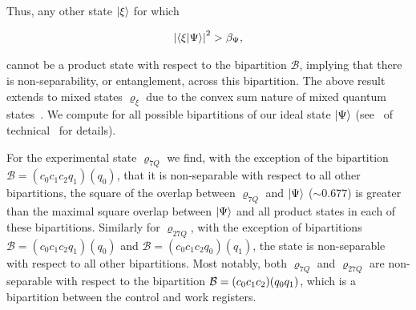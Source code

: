 \noindent
Thus, any other state $\ket{\xi}$ for which 

\begin{align}
    \abs{\ip{\xi}{\Psi}}^2 > \beta_{\Psi},
\end{align}

\noindent
cannot be a product state with respect to the bipartition $\mathcal{B}$, implying that there is non-separability, or entanglement, across this bipartition. The above result extends to mixed states $\varrho_\xi$ due to the convex sum nature of mixed quantum states~\cite{Toth_2008}. We compute  for all possible bipartitions of our ideal state $\ket{\Psi}$ (see~ of technical~ for details). 

\bigskip
\noindent
For the experimental state $\varrho_{7Q}$ we find, with the exception of the bipartition $\mathcal{B}=(c_0c_1c_2q_1)(q_0)$, that it is non-separable with respect to all other bipartitions, \ie the square of the overlap between $\varrho_{7Q}$ and $\ket{\Psi}$ ($\sim 0.677$) is greater than the maximal square overlap between $\ket{\Psi}$ and all product states in each of these bipartitions. Similarly for $\varrho_{27Q}$, with the exception of bipartitions $\mathcal{B}=(c_0c_1c_2q_1)(q_0)$ and $\mathcal{B}=(c_0c_1c_2q_0)(q_1)$, the state is non-separable with respect to all other bipartitions. Most notably, both $\varrho_{7Q}$ and $\varrho_{27Q}$ are non-separable with respect to the bipartition ${\cal B}=(c_0c_1c_2)(q_0q_1)$, which is a bipartition between the control and work registers. 





